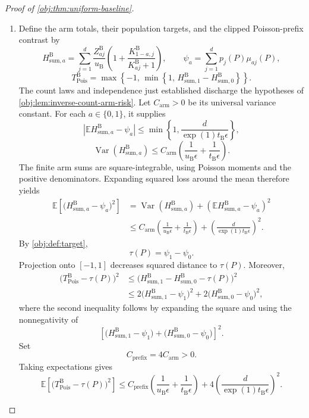 \begin{proof}[Proof of \cref{obj:thm:uniform-baseline}]
\begin{enumerate}
\item
Define the arm totals, their population targets, and the clipped Poisson-prefix contrast by
\[
H_{\mathrm{sum},a}^{\mathrm B}
=
\sum_{j=1}^d
\frac{Z_{aj}^{\mathrm B}}{u_{\mathrm B}}
\left(1+\frac{K_{1-a,j}^{\mathrm B}}{K_{aj}^{\mathrm B}+1}\right),
\qquad
\psi_a
=
\sum_{j=1}^d p_j(P)\mu_{aj}(P),
\]
\[
T_{\mathrm{Pois}}^{\mathrm B}
=
\max\!\left\{-1,\,
\min\!\left\{1,\,
H_{\mathrm{sum},1}^{\mathrm B}
-
H_{\mathrm{sum},0}^{\mathrm B}
\right\}\right\}.
\]
The count laws and independence just established discharge the hypotheses of
\cref{obj:lem:inverse-count-arm-risk}. Let \(C_{\mathrm{arm}}>0\) be its universal variance constant. For each \(a\in\{0,1\}\), it supplies
\[
\left|
\mathbb E H_{\mathrm{sum},a}^{\mathrm B}-\psi_a
\right|
\le
\min\!\left\{
1,\frac{d}{\exp(1)t_{\mathrm B}\epsilon}
\right\},
\]
\[
\operatorname{Var}\!\left(H_{\mathrm{sum},a}^{\mathrm B}\right)
\le
C_{\mathrm{arm}}
\left(
\frac{1}{u_{\mathrm B}\epsilon}
+
\frac{1}{t_{\mathrm B}\epsilon}
\right).
\]
The finite arm sums are square-integrable, using Poisson moments and the positive denominators. Expanding squared loss around the mean therefore yields
\[
\begin{aligned}
\mathbb E\!\left[
\bigl(H_{\mathrm{sum},a}^{\mathrm B}-\psi_a\bigr)^2
\right]
&=
\operatorname{Var}\!\left(H_{\mathrm{sum},a}^{\mathrm B}\right)
+
\left(\mathbb E H_{\mathrm{sum},a}^{\mathrm B}-\psi_a\right)^2\\
&\le
C_{\mathrm{arm}}
\left(
\frac{1}{u_{\mathrm B}\epsilon}
+
\frac{1}{t_{\mathrm B}\epsilon}
\right)
+
\left(\frac{d}{\exp(1)t_{\mathrm B}\epsilon}\right)^2.
\end{aligned}
\]
By \cref{obj:def:target},
\[
\tau(P)=\psi_1-\psi_0.
\]
Projection onto \([-1,1]\) decreases squared distance to \(\tau(P)\). Moreover,
\[
\begin{aligned}
\bigl(T_{\mathrm{Pois}}^{\mathrm B}-\tau(P)\bigr)^2
&\le
\bigl(H_{\mathrm{sum},1}^{\mathrm B}
-H_{\mathrm{sum},0}^{\mathrm B}-\tau(P)\bigr)^2\\
&\le
2\bigl(H_{\mathrm{sum},1}^{\mathrm B}-\psi_1\bigr)^2
+
2\bigl(H_{\mathrm{sum},0}^{\mathrm B}-\psi_0\bigr)^2,
\end{aligned}
\]
where the second inequality follows by expanding the square and using the nonnegativity of
\[
\left[
\bigl(H_{\mathrm{sum},1}^{\mathrm B}-\psi_1\bigr)
+
\bigl(H_{\mathrm{sum},0}^{\mathrm B}-\psi_0\bigr)
\right]^2.
\]
Set
\[
C_{\mathrm{prefix}}=4C_{\mathrm{arm}}>0.
\]
Taking expectations gives
\[
\mathbb E\!\left[
\bigl(T_{\mathrm{Pois}}^{\mathrm B}-\tau(P)\bigr)^2
\right]
\le
C_{\mathrm{prefix}}
\left(
\frac{1}{u_{\mathrm B}\epsilon}
+
\frac{1}{t_{\mathrm B}\epsilon}
\right)
+
4\left(\frac{d}{\exp(1)t_{\mathrm B}\epsilon}\right)^2.
\]


\end{enumerate}
\end{proof}
